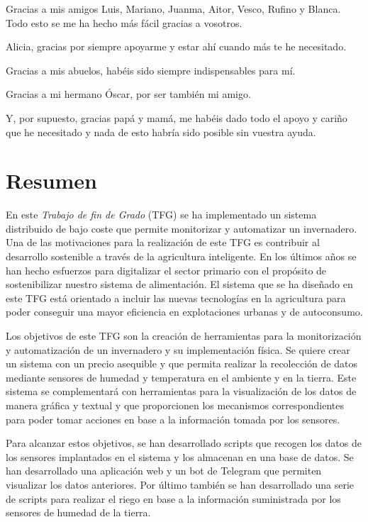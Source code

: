\documentclass[a4paper, 12pt, oneside]{book}
\begin{document}
Gracias a mis amigos Luis, Mariano, Juanma, Aitor, Vesco, Rufino y Blanca. Todo esto se me ha hecho más fácil gracias a vosotros.

Alicia, gracias por siempre apoyarme y estar ahí cuando más te he necesitado.

Gracias a mis abuelos, habéis sido siempre indispensables para mí.

Gracias a mi hermano Óscar, por ser también mi amigo.

Y, por supuesto, gracias papá y mamá, me habéis dado todo el apoyo y cariño que he necesitado y nada de esto habría sido posible sin vuestra ayuda.


\chapter*{Resumen}
En este \textit{Trabajo de fin de Grado} (TFG) se ha implementado un sistema distribuido de bajo coste que permite monitorizar y automatizar un invernadero. Una de las motivaciones para la realización de este TFG es contribuir al desarrollo sostenible a través de la agricultura inteligente. En los últimos años se han hecho esfuerzos para digitalizar el sector primario con el propósito de sostenibilizar nuestro sistema de alimentación. El sistema que se ha diseñado en este TFG está orientado a incluir las nuevas tecnologías en la agricultura para poder conseguir una mayor eficiencia en explotaciones urbanas y de autoconsumo.

Los objetivos de este TFG son la creación de herramientas para la monitorización y automatización de un invernadero y su implementación física. Se quiere crear un sistema con un precio asequible y que permita realizar la recolección de datos mediante sensores de humedad y temperatura en el ambiente y en la tierra. Este sistema se complementará con herramientas para la visualización de los datos de manera gráfica y textual y que proporcionen los mecanismos correspondientes para poder tomar acciones en base a la información tomada por los sensores.

Para alcanzar estos objetivos, se han desarrollado scripts que recogen los datos de los sensores implantados en el sistema y los almacenan en una base de datos. Se han desarrollado una aplicación web y un bot de Telegram que permiten visualizar los datos anteriores. Por último también se han desarrollado una serie de scripts para realizar el riego en base a la información suministrada por los sensores de humedad de la tierra.
\end{document}
